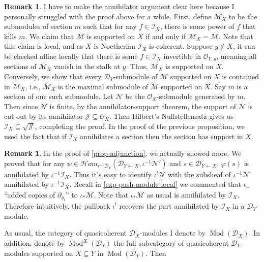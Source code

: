 \documentclass[11pt, a4paper]{article}
\theoremstyle{definition}
\newtheorem{remark}[theorem]{Remark}
\newcommand{\Mod}{\operatorname{Mod}}
\begin{document}
    \begin{remark}\label{rmk-support-d-module}
        I have to make the annihilator argument clear here because I personally struggled with the proof above for a while. First, define $\mathcal M_X$ to be the submodules of section $m$ such that for any $f\in\mathcal I_X$, there is some power of $f$ that kills $m$. We claim that $\mathcal M$ is supported on $X$ if and only if $\mathcal M_X=\mathcal M$. Note that this claim is local, and as $X$ is Noetherian $\mathcal I_X$ is coherent. Suppose $y\notin X$, it can be checked affine locally that there is some $f\in\mathcal I_X$ invertible in $\mathcal O_{Y, y}$, meaning all sections of $\mathcal M_X$ vanish in the stalk at $y$. Thus, $\mathcal M_X$ is supported on $X$. Conversely, we show that every $\mathcal D_Y$-submodule of $\mathcal M$ supported on $X$ is contained in $\mathcal M_X$, i.e., $\mathcal M_X$ is the maximal submodule of $\mathcal M$ supported on $X$. Say $m$ is a section of one such submodule. Let $\mathcal N$ be the $\mathcal O_X$-submodule generated by $m$. Then since $\mathcal N$ is finite, by the annihilator-support theorem, the support of $\mathcal N$ is cut out by its annihilator $\mathcal J\subseteq\mathcal O_X$. Then Hilbert's Nullstellensatz gives us $\mathcal I_X\subseteq\sqrt{\mathcal J}$, completing the proof. In the proof of the previous proposition, we used the fact that if $\mathcal I_X$ annihilates a section then the section has support in $X$.
    \end{remark}
    \begin{remark}\label{exp-ideal-kills-pullback}
        In the proof of \cref{prop-adjunction}, we actually showed more. We proved that for any $\psi\in\mathcal Hom_{\iota^{-1}\mathcal D_Y}(\mathcal D_{Y\leftarrow X},\iota^{-1}\mathcal N')$ and $s\in\mathcal D_{Y\leftarrow X}$, $\varphi(s)$ is annihilated by $\iota^{-1}\mathcal I_X$. Thus it's easy to identify $\iota^!\mathcal N$ with the subsheaf of $\iota^{-1}\mathcal N$ annihilated by $\iota^{-1}\mathcal I_X$. Recall in \cref{exp-push-module-local} we commented that $\iota_+$ ``added copies of $\partial_{y_i}$'' to $\iota_*\mathcal M$. Note that $\iota_*\mathcal M$ as usual is annihilated by $\mathcal I_X$. Therefore intuitively, the pullback $\iota^!$ recovers the part annihilated by $\mathcal I_X$ in a $\mathcal D_Y$-module.
    \end{remark}
    As usual, the category of quasicoherent $\mathcal D_X$-modules I denote by $\Mod(\mathcal D_X)$. In addition, denote by $\Mod^X(\mathcal D_Y)$ the full subcategory of quasicoherent $\mathcal D_Y$-modules supported on $X\subseteq Y$ in $\Mod(\mathcal D_Y)$. Then
\end{document}
